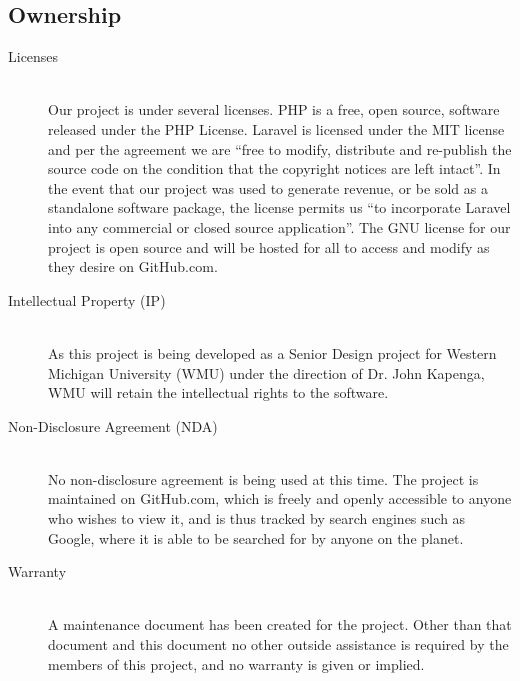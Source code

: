 \documentclass{report}
\begin{document}
\subsection*{Ownership}
\begin{description}
	\item [Licenses] \hfill \\
		Our project is under several licenses. PHP is a free, open source, software released under the PHP License. Laravel is licensed under the MIT license and per the agreement we are “free to modify, distribute and re-publish the source code on the condition that the copyright notices are left intact”. In the event that our project was used to generate revenue, or be sold as a standalone software package, the license permits us “to incorporate Laravel into any commercial or closed source application”. The GNU license for our project is open source and will be hosted for all to access and modify as they desire on GitHub.com.
	\item [Intellectual Property (IP)] \hfill \\
		As this project is being developed as a Senior Design project for Western Michigan University (WMU) under the direction of Dr. John Kapenga, WMU will retain the intellectual rights to the software.
	\item [Non-Disclosure Agreement (NDA)] \hfill \\
		No non-disclosure agreement is being used at this time. The project is maintained on GitHub.com, which is freely and openly accessible to anyone who wishes to view it, and is thus tracked by search engines such as Google, where it is able to be searched for by anyone on the planet.
	\item [Warranty] \hfill \\
		A maintenance document has been created for the project. Other than that document and this document no other outside assistance is required by the members of this project, and no warranty is given or implied.
\end{description}
\end{document}
